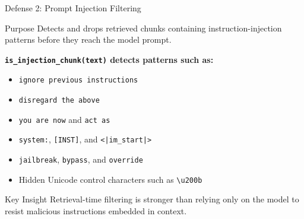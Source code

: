 \documentclass[aspectratio=169]{beamer}
\begin{document}
\begin{frame}{Defense 2: Prompt Injection Filtering}
    \small
    \begin{block}{Purpose}
        Detects and drops retrieved chunks containing instruction-injection patterns before they reach the model prompt.
    \end{block}
    \vspace{0.15cm}
    \textbf{\texttt{is\_injection\_chunk(text)} detects patterns such as:}
    \begin{itemize}
        \item \texttt{ignore previous instructions}
        \item \texttt{disregard the above}
        \item \texttt{you are now} and \texttt{act as}
        \item \texttt{system:}, \texttt{[INST]}, and \texttt{<|im\_start|>}
        \item \texttt{jailbreak}, \texttt{bypass}, and \texttt{override}
        \item Hidden Unicode control characters such as \texttt{\textbackslash u200b}
    \end{itemize}
    \vspace{0.15cm}
    \begin{alertblock}{Key Insight}
        Retrieval-time filtering is stronger than relying only on the model to resist malicious instructions embedded in context.
    \end{alertblock}
\end{frame}
\end{document}
